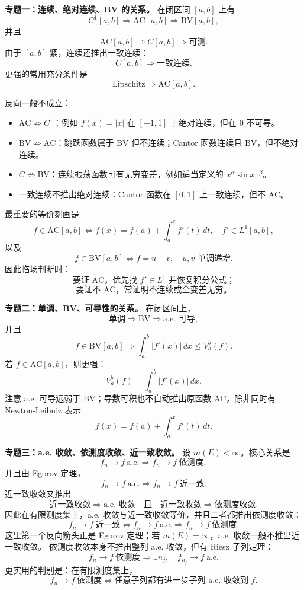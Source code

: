 \documentclass[
UTF8]{ctexart}
\providecommand{\tightlist}{%
\setlength{\itemsep}{0pt}\setlength{\parskip}{0pt}}
\newcommand{\impA}{\hspace{0.4em}{\small\textcolor{impAColor}{\textbf{[A 核心]}}}}
\begin{document}
\textbf{专题一：连续、绝对连续、BV 的关系。}\impA
在闭区间 \([a,b]\) 上有
\[
  C^1[a,b]\Longrightarrow \mathrm{AC}[a,b]\Longrightarrow \mathrm{BV}[a,b],
\]
并且
\[
  \mathrm{AC}[a,b]\Longrightarrow C[a,b]\Longrightarrow \text{可测}.
\]
由于 \([a,b]\) 紧，连续还推出一致连续：
\[
  C[a,b]\Longrightarrow \text{一致连续}.
\]
更强的常用充分条件是
\[
  \text{Lipschitz}\Longrightarrow \mathrm{AC}[a,b].
\]

反向一般不成立：
\begin{itemize}
  \tightlist
\item \(\mathrm{AC}\not\Rightarrow C^1\)：例如 \(f(x)=|x|\) 在 \([-1,1]\) 上绝对连续，但在 \(0\) 不可导。
\item \(\mathrm{BV}\not\Rightarrow \mathrm{AC}\)：跳跃函数属于 BV 但不连续；Cantor 函数连续且 BV，但不绝对连续。
\item \(C\not\Rightarrow \mathrm{BV}\)：连续振荡函数可有无穷变差，例如适当定义的 \(x^\alpha\sin x^{-\beta}\)。
\item 一致连续不推出绝对连续：Cantor 函数在 \([0,1]\) 上一致连续，但不 AC。
\end{itemize}

最重要的等价刻画是
\[
  f\in \mathrm{AC}[a,b]
  \Longleftrightarrow
  f(x)=f(a)+\int_a^x f'(t)\,dt,\quad f'\in L^1[a,b],
\]
以及
\[
  f\in\mathrm{BV}[a,b]
  \Longleftrightarrow
  f=u-v,\quad u,v\text{ 单调递增}.
\]
因此临场判断时：
\[
  \text{要证 AC，优先找 }f'\in L^1\text{ 并恢复积分公式；}
\]
\[
  \text{要证不 AC，常证明不连续或全变差无穷。}
\]

\textbf{专题二：单调、BV、可导性的关系。}\impA
在闭区间上，
\[
  \text{单调}\Longrightarrow \mathrm{BV}\Longrightarrow \text{a.e. 可导},
\]
并且
\[
  f\in \mathrm{BV}[a,b]\Longrightarrow
  \int_a^b|f'(x)|\,dx\le V_a^b(f).
\]
若 \(f\in\mathrm{AC}[a,b]\)，则更强：
\[
  V_a^b(f)=\int_a^b|f'(x)|\,dx.
\]
注意 a.e. 可导远弱于 BV；导数可积也不自动推出原函数 AC，除非同时有 Newton-Leibniz 表示
\[
  f(x)=f(a)+\int_a^x f'(t)\,dt.
\]

\textbf{专题三：a.e. 收敛、依测度收敛、近一致收敛。}\impA
设 \(m(E)<\infty\)。核心关系是
\[
  f_n\to f\ \text{a.e.}
  \Longrightarrow
  f_n\to f\ \text{依测度},
\]
并且由 Egorov 定理，
\[
  f_n\to f\ \text{a.e.}
  \Longrightarrow
  f_n\to f\ \text{近一致}.
\]
近一致收敛又推出
\[
  \text{近一致收敛}\Longrightarrow \text{a.e. 收敛}
  \quad\text{且}\quad
  \text{近一致收敛}\Longrightarrow \text{依测度收敛}.
\]
因此在有限测度集上，a.e. 收敛与近一致收敛等价，并且二者都推出依测度收敛：
\[
  f_n\to f\ \text{近一致}
  \Longleftrightarrow
  f_n\to f\ \text{a.e.}
  \Longrightarrow
  f_n\to f\ \text{依测度}.
\]
这里第一个反向箭头正是 Egorov 定理；若 \(m(E)=\infty\)，a.e. 收敛一般不推出近一致收敛。
依测度收敛本身不推出整列 a.e. 收敛，但有 Riesz 子列定理：
\[
  f_n\to f\ \text{依测度}
  \Longrightarrow
  \exists n_j,\quad f_{n_j}\to f\ \text{a.e.}
\]
更实用的判别是：在有限测度集上，
\[
  f_n\to f\ \text{依测度}
  \Longleftrightarrow
  \text{任意子列都有进一步子列 a.e. 收敛到 }f.
\]
\end{document}
